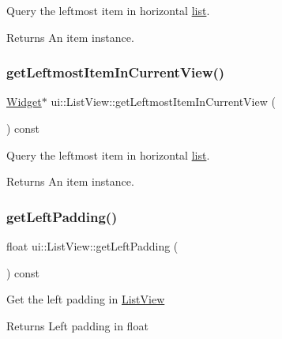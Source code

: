 Query the leftmost item in horizontal \hyperlink{protocollist-p}{list}. 

\begin{DoxyReturn}{Returns}
An item instance. 
\end{DoxyReturn}
\mbox{\label{classui_1_1ListView_af04187e02ececdb0124f37f1fbee32d9}} 
\subsubsection{\texorpdfstring{get\+Leftmost\+Item\+In\+Current\+View()}{getLeftmostItemInCurrentView()}\hspace{0.1cm}{\footnotesize\ttfamily [2/2]}}
{\footnotesize\ttfamily \hyperlink{classui_1_1Widget}{Widget}$\ast$ ui\+::\+List\+View\+::get\+Leftmost\+Item\+In\+Current\+View (\begin{DoxyParamCaption}{ }\end{DoxyParamCaption}) const}



Query the leftmost item in horizontal \hyperlink{protocollist-p}{list}. 

\begin{DoxyReturn}{Returns}
An item instance. 
\end{DoxyReturn}
\mbox{\label{classui_1_1ListView_a6ea04d617c8705f8eb6e6fce706b737b}} 
\subsubsection{\texorpdfstring{get\+Left\+Padding()}{getLeftPadding()}}
{\footnotesize\ttfamily float ui\+::\+List\+View\+::get\+Left\+Padding (\begin{DoxyParamCaption}{ }\end{DoxyParamCaption}) const}

Get the left padding in \hyperlink{classui_1_1ListView}{List\+View} \begin{DoxyReturn}{Returns}
Left padding in float 
\end{DoxyReturn}
\mbox{\label{classui_1_1ListView_acfed7db635b37551e6a1429b54dd8178}} 
